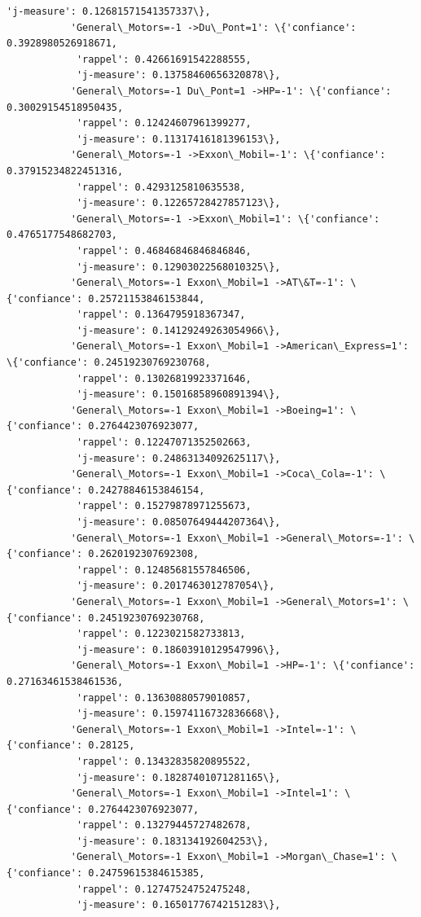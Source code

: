 \documentclass[11pt]{article}
\begin{document}
\begin{Verbatim}[commandchars=\\\{\}]
            'j-measure': 0.12681571541357337\},
           'General\_Motors=-1 ->Du\_Pont=1': \{'confiance': 0.3928980526918671,
            'rappel': 0.42661691542288555,
            'j-measure': 0.13758460656320878\},
           'General\_Motors=-1 Du\_Pont=1 ->HP=-1': \{'confiance': 0.30029154518950435,
            'rappel': 0.12424607961399277,
            'j-measure': 0.11317416181396153\},
           'General\_Motors=-1 ->Exxon\_Mobil=-1': \{'confiance': 0.37915234822451316,
            'rappel': 0.4293125810635538,
            'j-measure': 0.12265728427857123\},
           'General\_Motors=-1 ->Exxon\_Mobil=1': \{'confiance': 0.4765177548682703,
            'rappel': 0.46846846846846846,
            'j-measure': 0.12903022568010325\},
           'General\_Motors=-1 Exxon\_Mobil=1 ->AT\&T=-1': \{'confiance': 0.25721153846153844,
            'rappel': 0.1364795918367347,
            'j-measure': 0.14129249263054966\},
           'General\_Motors=-1 Exxon\_Mobil=1 ->American\_Express=1': \{'confiance': 0.24519230769230768,
            'rappel': 0.13026819923371646,
            'j-measure': 0.15016858960891394\},
           'General\_Motors=-1 Exxon\_Mobil=1 ->Boeing=1': \{'confiance': 0.2764423076923077,
            'rappel': 0.12247071352502663,
            'j-measure': 0.24863134092625117\},
           'General\_Motors=-1 Exxon\_Mobil=1 ->Coca\_Cola=-1': \{'confiance': 0.24278846153846154,
            'rappel': 0.15279878971255673,
            'j-measure': 0.08507649444207364\},
           'General\_Motors=-1 Exxon\_Mobil=1 ->General\_Motors=-1': \{'confiance': 0.2620192307692308,
            'rappel': 0.12485681557846506,
            'j-measure': 0.2017463012787054\},
           'General\_Motors=-1 Exxon\_Mobil=1 ->General\_Motors=1': \{'confiance': 0.24519230769230768,
            'rappel': 0.1223021582733813,
            'j-measure': 0.18603910129547996\},
           'General\_Motors=-1 Exxon\_Mobil=1 ->HP=-1': \{'confiance': 0.27163461538461536,
            'rappel': 0.13630880579010857,
            'j-measure': 0.15974116732836668\},
           'General\_Motors=-1 Exxon\_Mobil=1 ->Intel=-1': \{'confiance': 0.28125,
            'rappel': 0.13432835820895522,
            'j-measure': 0.18287401071281165\},
           'General\_Motors=-1 Exxon\_Mobil=1 ->Intel=1': \{'confiance': 0.2764423076923077,
            'rappel': 0.13279445727482678,
            'j-measure': 0.183134192604253\},
           'General\_Motors=-1 Exxon\_Mobil=1 ->Morgan\_Chase=1': \{'confiance': 0.24759615384615385,
            'rappel': 0.12747524752475248,
            'j-measure': 0.16501776742151283\},

\end{Verbatim}
\end{document}
